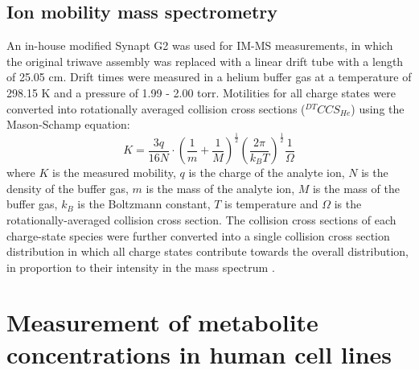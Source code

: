 \subsection{Ion mobility mass spectrometry}
\label{methods:imms_ccs}
An in-house modified Synapt G2 was used for IM-MS measurements, in which the original triwave assembly was replaced with a linear drift tube with a length of 25.05 cm. Drift times were measured in a helium buffer gas at a temperature of 298.15 K and a pressure of 1.99 - 2.00 torr. Motilities for all charge states were converted into rotationally averaged collision cross sections ($^{DT}CCS_{He}$) using the Mason-Schamp equation:
%
%
\begin{equation}
K = \frac{3q}{16N} \cdot \left( \frac{1}{m} + \frac{1}{M} \right)^{\frac{1}{2}} \left( \frac{2 \pi}{k_{B}T} \right)^{\frac{1}{2}} \frac{1}{\Omega}  
\end{equation} 
%
%
where $K$ is the measured mobility, $q$ is the charge of the analyte ion, $N$ is the density of the buffer gas, $m$ is the mass of the analyte ion, $M$ is the mass of the buffer gas, $k_{B}$ is the Boltzmann constant, $T$ is temperature and $\Omega$ is the rotationally-averaged collision cross section. The collision cross sections of each charge-state species were further converted into a single collision cross section distribution in which all charge states contribute towards the overall distribution, in proportion to their intensity in the mass spectrum \cite{Pacholarz:2014aa}. 

\clearpage

\section{Measurement of metabolite concentrations in human cell lines}


